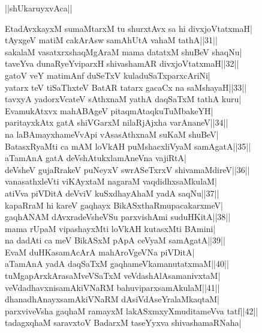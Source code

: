\documentclass{article}
\begin{document}
\begin{center}
||shUkaruyxvAca||
\end{center}

EtadAvxkayxM sumaMtarxM tu shurxtAvx sa hi divxjoVtatxmaH|\\
tAyxgeV matiM cakArAsw samAhUtA vahaM tathA||31||\\
sakalaM vasatxrxshaqMgAraM mama datatxM shuBeV shaqNu|\\
taveYva dunaRyeYviparxH shivashamAR divxjoVtatxmaH||32||\\
gatoV veY matimAnf duSeTxV kuladuSaTxparxcAriNi|\\
yatarx teV tiSaThxteV BatAR tatarx gacaCx na saMshayaH||33||\\
tavxyA yadorxVcateV sAthxnaM yathA daqSaTxM tathA kuru|\\
EvamukAtxvx mahABAgeV pitaqmAtaqkuTuMbakeYH|\\
paritayxkAtx gatA shiVGarxM nilaRjAjxha varAnaneV||34||\\
na laBAmayxhameVvApi vAsasAthxnaM suKaM shuBeV|\\
BatasxRyaMti ca mAM loVkAH puMshacxliVyaM samAgatA||35||\\
aTamAnA gatA deVshAtukxlamAneVna vajiRtA|\\
deVsheV gujaRrakeV puNeyxV swrASeTxrxV shivamaMdireV||36||\\
vanasathxleVti viKAyxtaM nagaraM vaqdidhxsaMkulaM|\\
atiVva piVDitA deVviV kuSxdhayAhaM yadA saqNu||37||\\
kapaRraM hi kareV gaqhayx BikASxthaRmupacakarxmeV|\\
gaqhANAM dAvxradeVsheVSu parxvishAmi suduHKitA||38||\\
mama rUpaM vipashayxMti loVkAH kutasxMti BAmini|\\
na dadAti ca meV BikASxM pApA ceVyaM samAgatA||39||\\
EvaM duHKasamAcArA mahAroVgeVNa piVDitA|\\
aTamAnA yadA daqSaTxM gaqhameVkamanutatxmaM||40||\\
tuMgapArxkArasaMveVSaTxM veVdashAlAsamanivxtaM|\\
veVdadhavxnisamAkiVNaRM bahuviparxsamAkulaM||41||\\
dhanadhAnayxsamAkiVNaRM dAsiVdAseYralaMkaqtaM|\\
parxviveVsha gaqhaM ramayxM lakASxmxyXmuditameVva tatf||42||\\
tadagxqhaM saravxtoV BadarxM taseYyxva shivashamaRNaha|\\
\end{document}

